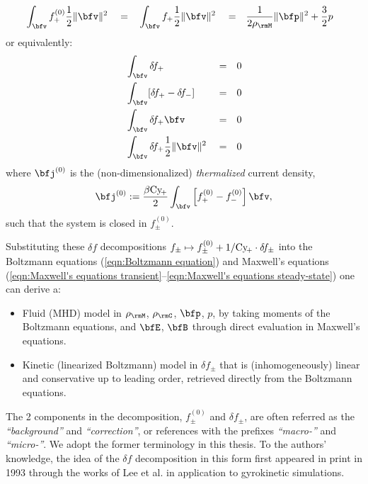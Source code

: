 \begin{definition}
\begin{align}
            &\int_{\bfv}f_{+}^{(0)}\frac{1}{2}\|\bfv\|^{2}      &  &=  &  &\int_{\bfv}f_{+}\frac{1}{2}\|\bfv\|^{2}  &  &=  &  \frac{1}{2\rho_{\rmM}}\|\bfp\|^{2} + \frac{3}{2}&p
        \end{align}
        or equivalently:
        \begin{align}
            &\int_{\bfv}\delta\!f_{+}                         &  &=  &  0  \label{eqn:correction mass moment}  \\
            &\int_{\bfv}[\delta\!f_{+} - \delta\!f_{-}]       &  &=  &  0  \\
            &\int_{\bfv}\delta\!f_{+}\bfv                     &  &=  &  0  \\
            &\int_{\bfv}\delta\!f_{+}\frac{1}{2}\|\bfv\|^{2}  &  &=  &  0  \label{eqn:correction energy moment}
        \end{align}
        where $\bfj^{(0)}$ is the (non-dimensionalized) \emph{thermalized} current density,
        \begin{equation}\label{eqn:thermalized current density}
            \bfj^{(0)}  :=  \frac{\beta\rmCy\!_{+}}{2}\int_{\bfv}\left[f_{+}^{(0)} - f_{-}^{(0)}\right]\bfv,
        \end{equation}
        such that the system is closed in $f_{\pm}^{(0)}$.

        Substituting these $\delta\!f$ decompositions $f_{\pm}  \mapsto  f_{\pm}^{(0)} + 1/\mathrm{Cy}\!_{+}\cdot\delta\!f_{\pm}$ into the Boltzmann equations (\ref{eqn:Boltzmann equation}) and Maxwell's equations (\ref{eqn:Maxwell's equations transient}--\ref{eqn:Maxwell's equations steady-state}) one can derive a:
        \begin{itemize}
            \item  Fluid (MHD) model in $\rho_{\rmM}$, $\rho_{\rmC}$, $\bfp$, $p$, by taking moments of the Boltzmann equations, and $\bfE$, $\bfB$ through direct evaluation in Maxwell's equations.
            \item  Kinetic (linearized Boltzmann) model in $\delta\!f_{\pm}$ that is (inhomogeneously) linear and conservative up to leading order, retrieved directly from the Boltzmann equations.
        \end{itemize}
    \end{definition}
    
    The 2 components in the decomposition, $f_{\pm}^{(0)}$ and $\delta\!f_{\pm}$, are often referred as the \emph{``background''} and \emph{``correction''}, or references with the prefixes \emph{``macro-''} and \emph{``micro-''}. We adopt the former terminology in this thesis. To the authors' knowledge, the idea of the $\delta\!f$ decomposition in this form first appeared in print in 1993 through the works of Lee et al. \cite{Parker_Lee_1993, Dimits_Lee_1993} in application to gyrokinetic simulations.

